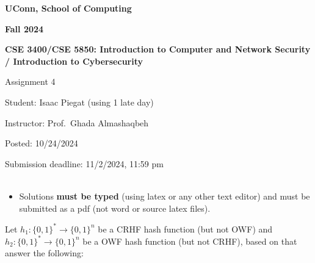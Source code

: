 \documentclass[12pt]{article}
\newcommand{\zo}{\{0,1\}}
\newcommand{\handout}[2]{
\renewcommand{\thepage}{\footnotesize CSE 3400/CSE 5850, #1, p. \arabic{page}}
\begin{center}

\noindent
{\bf UConn, School of Computing}

\noindent
{\bf Fall 2024}

\noindent
{\bf CSE 3400/CSE 5850: Introduction to Computer and Network Security \\ / Introduction to Cybersecurity}
\end{center}

\begin{center}
{\Large #1}
\end{center}
}
\begin{document}
\handout{Assignment 4}{}

\noindent
{Student: Isaac Piegat (using 1 late day)}

\noindent
{Instructor: Prof.~Ghada Almashaqbeh}

\noindent
{Posted: 10/24/2024}

\noindent
{Submission deadline: 11/2/2024, 11:59 pm} \\\\

\begin{itemize}
\item Solutions {\bf must be typed} (using latex or any other text editor) and must be submitted as a pdf (not word or source latex files).
\end{itemize}

Let $h_1:\zo^{*} \to \zo^{n}$ be a CRHF hash function (but not OWF) and $h_2: \zo^{*} \to \zo^{n}$ be a OWF hash function (but not CRHF), based on that answer the following: 
\end{document}
